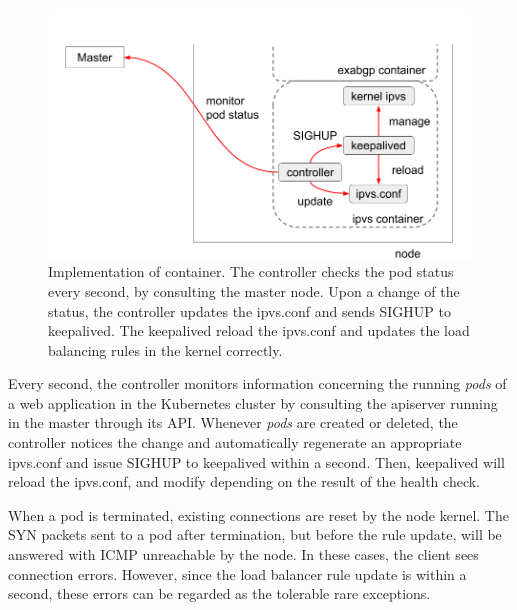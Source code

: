 \begin{figure}[h]
  \centering
  \includegraphics[width=0.8\columnwidth]{Figs/ipvs-ingress-schem}
  
    \par\bigskip
    \centering
    \begin{minipage}{0.9\columnwidth}
      \caption[Implementation of IPVS container]{
        Implementation of  container.
        The controller checks the pod status every second, by consulting the master node.
        Upon a change of the status, the controller updates the ipvs.conf and sends SIGHUP to keepalived.
        The keepalived reload the ipvs.conf and updates the load balancing rules in the kernel correctly.
      }
      \label{fig:ipvs-ingress-schem}
    \end{minipage}
\end{figure}

Every second, the controller monitors information concerning the running {\em pods} of a web application in the Kubernetes cluster by consulting the apiserver running in the master through its API.
Whenever {\em pods} are created or deleted, the controller notices the change and automatically regenerate an appropriate ipvs.conf 
and issue SIGHUP to keepalived within a second.
Then, keepalived will reload the ipvs.conf, and modify  depending on the result of the health check.

When a pod is terminated, existing connections are reset by the node kernel.
The SYN packets sent to a pod after termination, but before the  rule update, will be answered with ICMP unreachable by the node.
In these cases, the client sees connection errors.
However, since the load balancer rule update is within a second, these errors can be regarded as the tolerable rare exceptions.

